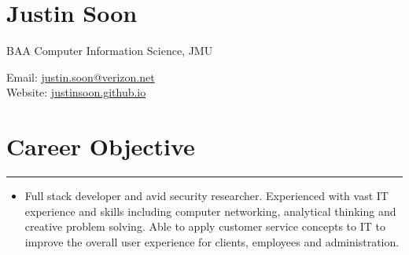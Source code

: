 \documentclass[a4paper]{article}
\author{Justin Soon}
\begin{document}
\section*{\huge\textbf Justin Soon}
\begin{minipage}{.45\linewidth}
	\begin{flushleft}
		BAA Computer Information Science, JMU\\
	\end{flushleft}
\end{minipage}
\hfill
\begin{minipage}{.45\linewidth}
	\begin{flushright}
		Email: \href{mailto:justin.soon@verizon.net}{justin.soon@verizon.net}\\
		Website: \href{http://justinsoon.github.io/}{justinsoon.github.io}\\
	\end{flushright}
\end{minipage}

\section*{Career Objective}
\hrule
\vspace{3mm}
\begin{itemize}
	\item Full stack developer and avid security researcher. Experienced with vast IT experience and skills including computer networking, analytical thinking and creative problem solving. Able to apply customer service concepts to IT to improve the overall user experience for clients, employees and administration.\\
\end{itemize}

\end{document}
